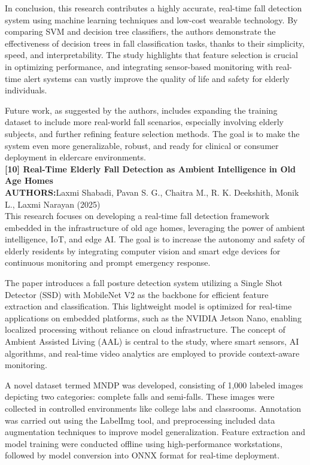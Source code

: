 \documentclass[a4paper, 12pt]{report}
\begin{document}
In conclusion, this research contributes a highly accurate, real-time fall detection system using machine learning techniques and low-cost wearable technology. By comparing SVM and decision tree classifiers, the authors demonstrate the effectiveness of decision trees in fall classification tasks, thanks to their simplicity, speed, and interpretability. The study highlights that feature selection is crucial in optimizing performance, and integrating sensor-based monitoring with real-time alert systems can vastly improve the quality of life and safety for elderly individuals.

Future work, as suggested by the authors, includes expanding the training dataset to include more real-world fall scenarios, especially involving elderly subjects, and further refining feature selection methods. The goal is to make the system even more generalizable, robust, and ready for clinical or consumer deployment in eldercare environments.\\
\noindent\textbf{[10] Real-Time Elderly Fall Detection as Ambient Intelligence in Old Age Homes}\\
\textbf{AUTHORS:}Laxmi Shabadi, Pavan S. G., Chaitra M., R. K. Deekshith, Monik L., Laxmi Narayan (2025)\\
This research focuses on developing a real-time fall detection framework embedded in the infrastructure of old age homes, leveraging the power of ambient intelligence, IoT, and edge AI. The goal is to increase the autonomy and safety of elderly residents by integrating computer vision and smart edge devices for continuous monitoring and prompt emergency response.

The paper introduces a fall posture detection system utilizing a Single Shot Detector (SSD) with MobileNet V2 as the backbone for efficient feature extraction and classification. This lightweight model is optimized for real-time applications on embedded platforms, such as the NVIDIA Jetson Nano, enabling localized processing without reliance on cloud infrastructure. The concept of Ambient Assisted Living (AAL) is central to the study, where smart sensors, AI algorithms, and real-time video analytics are employed to provide context-aware monitoring.

A novel dataset termed MNDP was developed, consisting of 1,000 labeled images depicting two categories: complete falls and semi-falls. These images were collected in controlled environments like college labs and classrooms. Annotation was carried out using the LabelImg tool, and preprocessing included data augmentation techniques to improve model generalization. Feature extraction and model training were conducted offline using high-performance workstations, followed by model conversion into ONNX format for real-time deployment.
\end{document}
